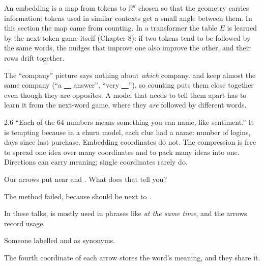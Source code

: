 \Exactly An embedding is a map from tokens to $\mathbb{R}^d$ chosen so that the geometry carries
information: tokens used in similar contexts get a small angle between them. In this section the map came
from counting. In a transformer the table $E$ is learned by the next-token game itself (Chapter 8): if
two tokens tend to be followed by the same words, the nudges that improve one also improve the other, and
their rows drift together.

\begin{breaks}
The ``company'' picture says nothing about \emph{which} company.  and  keep almost the
same company (``a \underline{\ \ } answer'', ``very \underline{\ \ }''), so counting puts them close
together even though they are opposites. A model that needs to tell them apart has to learn it from the
next-word game, where they \emph{are} followed by different words.
\end{breaks}

\begin{wrongidea}{2.6}
``Each of the 64 numbers means something you can name, like sentiment.'' It is tempting because in a churn model,
each clue had a name: number of logins, days since last purchase. Embedding coordinates do not. The
compression is free to spread one idea over many coordinates and to pack many ideas into one. Directions
can carry meaning; single coordinates rarely do.
\end{wrongidea}

\begin{checkq}
Our arrows put  near  and . What does that tell you?
\begin{options}
\item The method failed, because  should be next to .
\item In these talks,  is mostly used in phrases like \emph{at the same time}, and the
arrows record usage.
\item Someone labelled  and  as synonyms.
\item The fourth coordinate of each arrow stores the word's meaning, and they share it.
\end{options}
\end{checkq}


